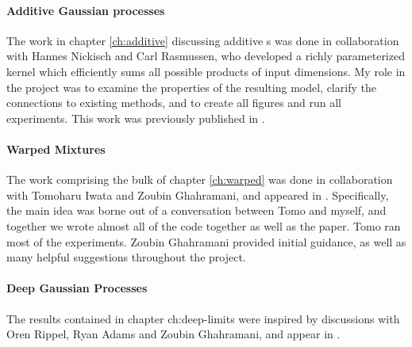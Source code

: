 \paragraph{Additive Gaussian processes}

The work in chapter \ref{ch:additive} discussing additive \gp{}s was done in collaboration with Hannes Nickisch and Carl Rasmussen, who developed a richly parameterized kernel which efficiently sums all possible products of input dimensions.
My role in the project was to examine the properties of the resulting model, clarify the connections to existing methods, and to create all figures and run all experiments.
This work was previously published in \citep{duvenaud2011additive11}.


\paragraph{Warped Mixtures}
The work comprising the bulk of chapter \ref{ch:warped} was done in collaboration with Tomoharu Iwata and Zoubin Ghahramani, and appeared in \citep{IwaDuvGha12}.
Specifically, the main idea was borne out of a conversation between Tomo and myself, and together we wrote almost all of the code together as well as the paper.
Tomo ran most of the experiments.
Zoubin Ghahramani provided initial guidance, as well as many helpful suggestions throughout the project.


\paragraph{Deep Gaussian Processes}
The results contained in chapter {ch:deep-limits} were inspired by discussions with Oren Rippel, Ryan Adams and Zoubin Ghahramani, and appear in \citep{DuvRipAdaGha14}.

\outbpdocument{


}


